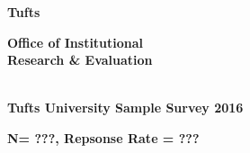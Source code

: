 \documentclass{article}
\begin{document}
\noindent\begin{minipage}{0.5\textwidth}
\begin{flushleft}
  \textbf{\Huge Tufts}
\end{flushleft}
\end{minipage}
\hfill
\noindent\begin{minipage}{0.5\textwidth}
\begin{flushright}
  \textbf{\large Office of Institutional\\ Research \& Evaluation} 
\end{flushright}
\end{minipage}
\hfill
\begin{center}
  \textbf{\LARGE \\Tufts University Sample Survey 2016 }
\end{center}
\begin{center}
  \textbf{\normalsize N= ???, Repsonse Rate = ??? }
\end{center}
\noindent\makebox[\linewidth]{\rule{\textwidth}{1pt}} 
\nopagebreak
\end{document}
